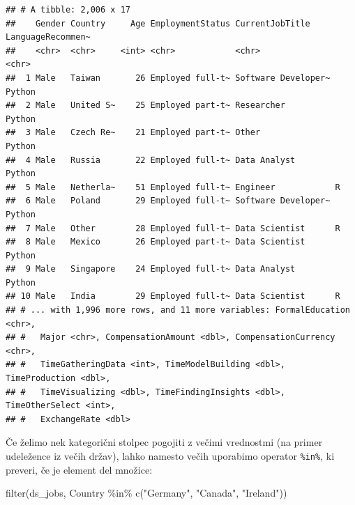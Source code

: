 \documentclass[
]{book}
\newenvironment{Shaded}{\begin{snugshade}}{\end{snugshade}}
\newcommand{\FunctionTok}[1]{\textcolor[rgb]{0.00,0.00,0.00}{#1}}
\newcommand{\NormalTok}[1]{#1}
\newcommand{\SpecialCharTok}[1]{\textcolor[rgb]{0.00,0.00,0.00}{#1}}
\newcommand{\StringTok}[1]{\textcolor[rgb]{0.31,0.60,0.02}{#1}}
\begin{document}
\begin{verbatim}
## # A tibble: 2,006 x 17
##    Gender Country     Age EmploymentStatus CurrentJobTitle     LanguageRecommen~
##    <chr>  <chr>     <int> <chr>            <chr>               <chr>            
##  1 Male   Taiwan       26 Employed full-t~ Software Developer~ Python           
##  2 Male   United S~    25 Employed part-t~ Researcher          Python           
##  3 Male   Czech Re~    21 Employed part-t~ Other               Python           
##  4 Male   Russia       22 Employed full-t~ Data Analyst        Python           
##  5 Male   Netherla~    51 Employed full-t~ Engineer            R                
##  6 Male   Poland       29 Employed full-t~ Software Developer~ Python           
##  7 Male   Other        28 Employed full-t~ Data Scientist      R                
##  8 Male   Mexico       26 Employed part-t~ Data Scientist      Python           
##  9 Male   Singapore    24 Employed full-t~ Data Analyst        Python           
## 10 Male   India        29 Employed full-t~ Data Scientist      R                
## # ... with 1,996 more rows, and 11 more variables: FormalEducation <chr>,
## #   Major <chr>, CompensationAmount <dbl>, CompensationCurrency <chr>,
## #   TimeGatheringData <int>, TimeModelBuilding <dbl>, TimeProduction <dbl>,
## #   TimeVisualizing <dbl>, TimeFindingInsights <dbl>, TimeOtherSelect <int>,
## #   ExchangeRate <dbl>
\end{verbatim}

Če želimo nek kategorični stolpec pogojiti z večimi vrednostmi (na primer udeležence iz večih držav), lahko namesto večih \texttt{\textbar{}} uporabimo operator \texttt{\%in\%}, ki preveri, če je element del množice:

\begin{Shaded}
\begin{Highlighting}[]
\FunctionTok{filter}\NormalTok{(ds\_jobs, Country }\SpecialCharTok{\%in\%} \FunctionTok{c}\NormalTok{(}\StringTok{"Germany"}\NormalTok{, }\StringTok{"Canada"}\NormalTok{, }\StringTok{"Ireland"}\NormalTok{))}
\end{Highlighting}
\end{Shaded}
\end{document}
